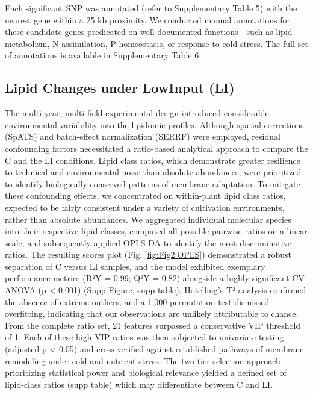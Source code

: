 \documentclass[10pt,letterpaper]{article}
\begin{document}
Each significant SNP was annotated (refer to Supplementary Table 5) with the nearest gene within a 25 kb proximity. We conducted manual annotations for these candidate genes predicated on well-documented functions—such as lipid metabolism, N assimilation, P homeostasis, or response to cold stress. The full set of annotations is available in Supplementary Table 6.

\subsection*{Lipid Changes under LowInput (LI)}
The multi-year, multi-field experimental design introduced considerable environmental variability into the lipidomic profiles. Although spatial corrections (SpATS) and batch-effect normalization (SERRF) were employed, residual confounding factors necessitated a ratio-based analytical approach to compare the C and the LI conditions. Lipid class ratios, which demonstrate greater resilience to technical and environmental noise than absolute abundances, were prioritized to identify biologically conserved patterns of membrane adaptation. To mitigate these confounding effects, we concentrated on within-plant lipid class ratios, expected to be fairly consistent under a variety of cultivation environments, rather than absolute abundances. We aggregated individual molecular species into their respective lipid classes, computed all possible pairwise ratios on a linear scale, and subsequently applied OPLS-DA to identify the most discriminative ratios. The resulting scores plot (Fig. \ref{fig:Fig2:OPLS}) demonstrated a robust separation of C versus LI samples, and the model exhibited exemplary performance metrics (R²Y = 0.99; Q²Y = 0.82) alongside a highly significant CV-ANOVA (p < 0.001) (Supp Figure, supp table). Hotelling’s T² analysis confirmed the absence of extreme outliers, and a 1,000-permutation test dismissed overfitting, indicating that our observations are unlikely attributable to chance. From the complete ratio set, 21 features surpassed a conservative VIP threshold of 1. Each of these high VIP ratios was then subjected to univariate testing (adjusted p < 0.05) and cross-verified against established pathways of membrane remodeling under cold and nutrient stress. The two-tier selection approach prioritizing statistical power and biological relevance yielded a defined set of lipid-class ratios (supp table) which may differentiate between C and LI.
\end{document}
